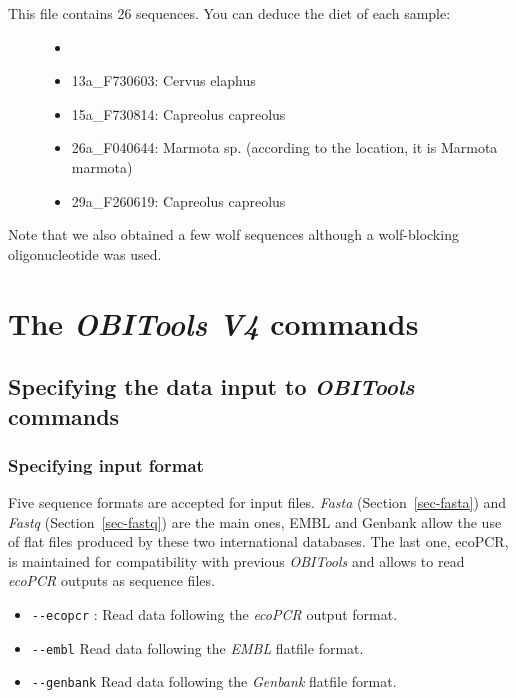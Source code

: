 \documentclass[
  letterpaper,
  DIV=11,
  numbers=noendperiod]{scrreprt}
\providecommand{\tightlist}{%
  \setlength{\itemsep}{0pt}\setlength{\parskip}{0pt}}\usepackage{longtable,booktabs,array}
\begin{document}
\begin{description}
\item[This file contains 26 sequences. You can deduce the diet of each
sample:]
\begin{itemize}
\tightlist
\item[]
\item
  13a\_F730603: Cervus elaphus
\item
  15a\_F730814: Capreolus capreolus
\item
  26a\_F040644: Marmota sp. (according to the location, it is Marmota
  marmota)
\item
  29a\_F260619: Capreolus capreolus
\end{itemize}
\end{description}

Note that we also obtained a few wolf sequences although a wolf-blocking
oligonucleotide was used.

\part{The \emph{OBITools V4} commands}

\hypertarget{specifying-the-data-input-to-obitools-commands}{%
\chapter{\texorpdfstring{Specifying the data input to \emph{OBITools}
commands}{Specifying the data input to OBITools commands}}\label{specifying-the-data-input-to-obitools-commands}}

\hypertarget{specifying-input-format}{%
\section{Specifying input format}\label{specifying-input-format}}

Five sequence formats are accepted for input files. \emph{Fasta}
(Section~\ref{sec-fasta}) and \emph{Fastq} (Section~\ref{sec-fastq}) are
the main ones, EMBL and Genbank allow the use of flat files produced by
these two international databases. The last one, ecoPCR, is maintained
for compatibility with previous \emph{OBITools} and allows to read
\emph{ecoPCR} outputs as sequence files.

\begin{itemize}
\tightlist
\item
  \texttt{-\/-ecopcr} : Read data following the \emph{ecoPCR} output
  format.
\item
  \texttt{-\/-embl} Read data following the \emph{EMBL} flatfile format.
\item
  \texttt{-\/-genbank} Read data following the \emph{Genbank} flatfile
  format.
\end{itemize}
\end{document}
